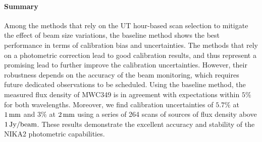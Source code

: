 \paragraph{Summary} Among the methods that rely on the UT hour-based
scan selection to mitigate the effect of beam size variations, the
baseline method shows the best performance in terms of calibration
bias and uncertainties. The methods that rely on a photometric correction
lead to good calibration results, and thus represent a promising lead
to further improve the calibration uncertainties. However, their
robustness depends on the accuracy of the beam monitoring, which
requires future dedicated observations to be scheduled. 
Using the baseline method, the measured flux density of
MWC349 is in agreement with expectations within $5\%$ for both
wavelengths. Moreover, we find calibration uncertainties of $5.7\%$ at
$1\,\rm{mm}$ and $3\%$ at $2\,\rm{mm}$ using a series of 264 scans of
sources of flux density above $1\, \rm{Jy}/\rm{beam}$. These results
demonstrate the excellent accuracy and stability of the NIKA2
photometric capabilities.





